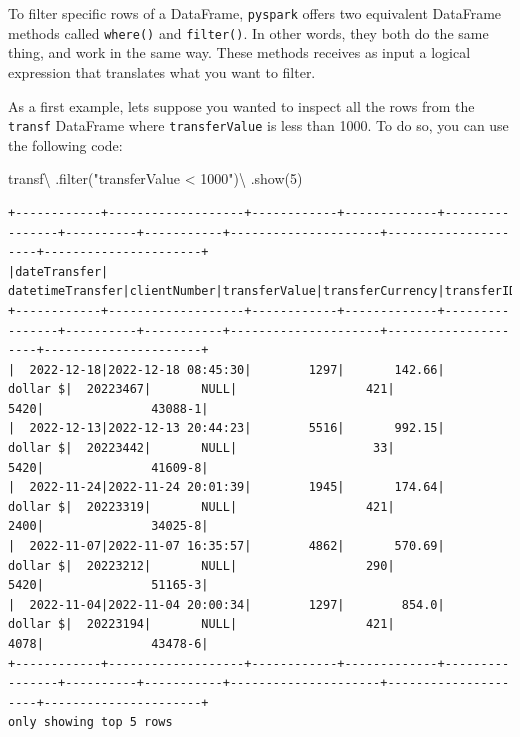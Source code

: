 \documentclass[
  11pt,
  letterpaper,
  DIV=11,
  numbers=noendperiod]{scrreprt}
\newenvironment{Shaded}{\begin{snugshade}}{\end{snugshade}}
\newcommand{\BuiltInTok}[1]{\textcolor[rgb]{0.00,0.23,0.31}{#1}}
\newcommand{\DecValTok}[1]{\textcolor[rgb]{0.68,0.00,0.00}{#1}}
\newcommand{\NormalTok}[1]{\textcolor[rgb]{0.00,0.23,0.31}{#1}}
\newcommand{\OperatorTok}[1]{\textcolor[rgb]{0.37,0.37,0.37}{#1}}
\newcommand{\StringTok}[1]{\textcolor[rgb]{0.13,0.47,0.30}{#1}}
\begin{document}
To filter specific rows of a DataFrame, \texttt{pyspark} offers two
equivalent DataFrame methods called \texttt{where()} and
\texttt{filter()}. In other words, they both do the same thing, and work
in the same way. These methods receives as input a logical expression
that translates what you want to filter.

As a first example, lets suppose you wanted to inspect all the rows from
the \texttt{transf} DataFrame where \texttt{transferValue} is less than
1000. To do so, you can use the following code:

\begin{Shaded}
\begin{Highlighting}[]
\NormalTok{transf}\OperatorTok{\textbackslash{}}
\NormalTok{  .}\BuiltInTok{filter}\NormalTok{(}\StringTok{"transferValue \textless{} 1000"}\NormalTok{)}\OperatorTok{\textbackslash{}}
\NormalTok{  .show(}\DecValTok{5}\NormalTok{)}
\end{Highlighting}
\end{Shaded}

\begin{verbatim}
+------------+-------------------+------------+-------------+----------------+----------+-----------+---------------------+---------------------+----------------------+
|dateTransfer|   datetimeTransfer|clientNumber|transferValue|transferCurrency|transferID|transferLog|destinationBankNumber|destinationBankBranch|destinationBankAccount|
+------------+-------------------+------------+-------------+----------------+----------+-----------+---------------------+---------------------+----------------------+
|  2022-12-18|2022-12-18 08:45:30|        1297|       142.66|        dollar $|  20223467|       NULL|                  421|                 5420|               43088-1|
|  2022-12-13|2022-12-13 20:44:23|        5516|       992.15|        dollar $|  20223442|       NULL|                   33|                 5420|               41609-8|
|  2022-11-24|2022-11-24 20:01:39|        1945|       174.64|        dollar $|  20223319|       NULL|                  421|                 2400|               34025-8|
|  2022-11-07|2022-11-07 16:35:57|        4862|       570.69|        dollar $|  20223212|       NULL|                  290|                 5420|               51165-3|
|  2022-11-04|2022-11-04 20:00:34|        1297|        854.0|        dollar $|  20223194|       NULL|                  421|                 4078|               43478-6|
+------------+-------------------+------------+-------------+----------------+----------+-----------+---------------------+---------------------+----------------------+
only showing top 5 rows
\end{verbatim}
\end{document}
